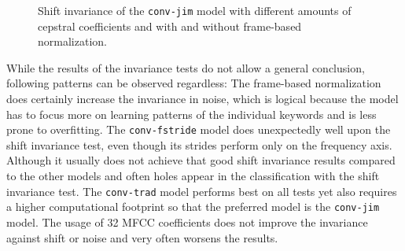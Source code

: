 \begin{figure}[!ht]
  \centering
  \caption{Shift invariance of the \texttt{conv-jim} model with different amounts of cepstral coefficients and with and without frame-based normalization.}
  \label{fig:exp_fs_cepstral_tb_shift_conv-jim}
\end{figure}
\FloatBarrier
\noindent
While the results of the invariance tests do not allow a general conclusion, following patterns can be observed regardless:
The frame-based normalization does certainly increase the invariance in noise, which is logical because the model has to focus more on learning patterns of the individual keywords and is less prone to overfitting.
The \texttt{conv-fstride} model does unexpectedly well upon the shift invariance test, even though its strides perform only on the frequency axis.
Although it usually does not achieve that good shift invariance results compared to the other models and often holes appear in the classification with the shift invariance test.
The \texttt{conv-trad} model performs best on all tests yet also requires a higher computational footprint so that the preferred model is the \texttt{conv-jim} model.
The usage of 32 MFCC coefficients does not improve the invariance against shift or noise and very often worsens the results.



